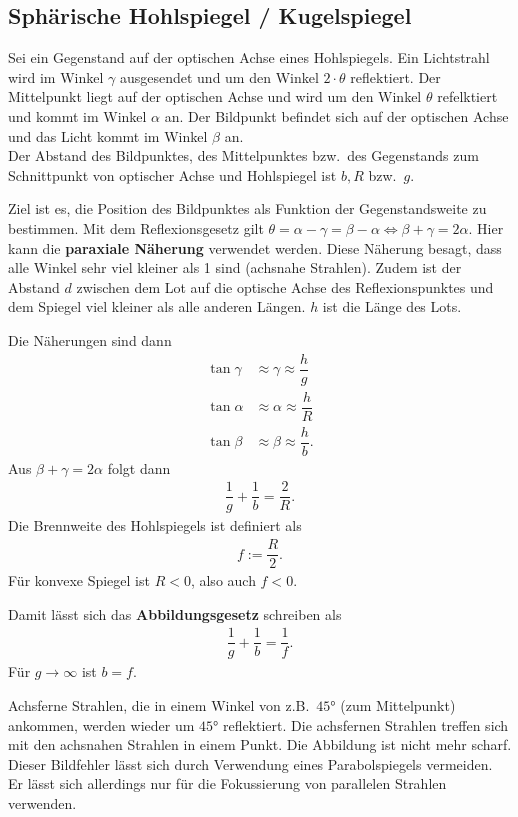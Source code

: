 \documentclass[a4paper,12pt]{article}
\numberwithin{equation}{section}
\begin{document}
\subsection{Sphärische Hohlspiegel / Kugelspiegel}
Sei ein Gegenstand auf der optischen Achse eines Hohlspiegels. Ein Lichtstrahl wird im Winkel $\gamma $ ausgesendet und um den Winkel $2\cdot \theta $ reflektiert. Der Mittelpunkt liegt auf der optischen Achse und wird um den Winkel $\theta $ refelktiert und kommt im Winkel $\alpha $ an. Der Bildpunkt befindet sich auf der optischen Achse und das Licht kommt im Winkel $\beta $ an.\\\indent
Der Abstand des Bildpunktes, des Mittelpunktes bzw.\ des Gegenstands zum Schnittpunkt von optischer Achse und Hohlspiegel ist $b,R$ bzw.\ $g$.\par
Ziel ist es, die Position des Bildpunktes als Funktion der Gegenstandsweite zu bestimmen. Mit dem Reflexionsgesetz gilt $\theta =\alpha -\gamma =\beta -\alpha \Leftrightarrow \beta +\gamma =2\alpha $. Hier kann die \textbf{paraxiale Näherung} verwendet werden. Diese Näherung besagt, dass alle Winkel sehr viel kleiner als 1 sind (achsnahe Strahlen). Zudem ist der Abstand $d$ zwischen dem Lot auf die optische Achse des Reflexionspunktes und dem Spiegel viel kleiner als alle anderen Längen. $h$ ist die Länge des Lots.\par
Die Näherungen sind dann 
\begin{align} 
        \tan \gamma &\approx \gamma \approx \dfrac{h}{g}\\
        \tan \alpha &\approx \alpha \approx \dfrac{h}{R}\\
        \tan \beta &\approx \beta \approx \dfrac{h}{b}
.\end{align} 
Aus $\beta +\gamma =2\alpha $ folgt dann
\begin{align} 
        \dfrac{1}{g}+\dfrac{1}{b}=\dfrac{2}{R}
.\end{align} 
Die Brennweite des Hohlspiegels ist definiert als
\begin{align} 
        f:=\dfrac{R}{2}
.\end{align} 
Für konvexe Spiegel ist $R<0$, also auch $f<0$.\par
Damit lässt sich das \textbf{Abbildungsgesetz} schreiben als
\begin{align} 
        \dfrac{1}{g}+\dfrac{1}{b}=\dfrac{1}{f}
.\end{align} 
Für $g\rightarrow \infty$ ist $b=f$.\par
Achsferne Strahlen, die in einem Winkel von z.B.\ $\ang{45}$ (zum Mittelpunkt) ankommen, werden wieder um $\ang{45}$ reflektiert. Die achsfernen Strahlen treffen sich mit den achsnahen Strahlen in einem Punkt. Die Abbildung ist nicht mehr scharf. Dieser Bildfehler lässt sich durch Verwendung eines Parabolspiegels vermeiden. Er lässt sich allerdings nur für die Fokussierung von parallelen Strahlen verwenden.
\end{document}
